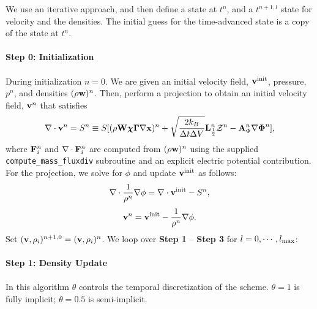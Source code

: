 \documentclass[final]{siamltex}
\def\Ab {{\bf A}}
\def\Fb {{\bf F}}
\def\Lb {{\bf L}}
\def\vb {{\bf v}}
\def\wb {{\bf w}}
\def\Wb {{\bf W}}
\def\xb {{\bf x}}
\def\chib   {\boldsymbol{\chi}}
\def\Gammab {\boldsymbol{\Gamma}}
\def\Phib   {\boldsymbol{\Phi}}
\def\half   {\frac{1}{2}}
\begin{document}
We use an iterative approach, and then define a state at $t^n$, and
a $t^{n+1,l}$ state for velocity and the densities.  The initial guess for
the time-advanced state is a copy of the state at $t^n$.\\ \\
{\bf Step 0: Initialization}\\ \\
During initialization $n=0$.
We are given an initial velocity field, $\vb^{\rm init}$, pressure, $p^n$,
and densities $(\rho\wb)^n$.
Then, perform a projection to obtain an initial velocity field, $\vb^n$ that satisfies
\begin{equation}
\nabla\cdot\vb^n = S^n \equiv 
S[(\rho\Wb\chib\Gammab\nabla\xb)^n + \sqrt{\frac{2k_B}{\Delta t\Delta V}}\Lb_\half^n\mathcal{Z}^n - \Ab_\Phi^n\nabla\Phib^n],
\end{equation}
where $\Fb_i^n$ and $\nabla\cdot\Fb_i^n$ are computed from $(\rho\wb)^n$ using the 
supplied {\tt compute\_mass\_fluxdiv} subroutine and an explicit electric
potential contribution.
For the projection, we solve for $\phi$ and update $\vb^{\rm init}$ as follows:
\begin{equation}
\nabla\cdot\frac{1}{\rho^n}\nabla\phi = \nabla\cdot\vb^{\rm init} - S^n,
\end{equation}
\begin{equation}
\vb^n = \vb^{\rm init} - \frac{1}{\rho^n}\nabla\phi.
\end{equation}
Set $(\vb,\rho_i)^{n+1,0} = (\vb,\rho_i)^n$.
We loop over {\bf Step 1} -- {\bf Step 3} for $l=0,\cdots,l_{\rm max}$:\\ \\
{\bf Step 1: Density Update}\\ \\
In this algorithm $\theta$ controls
the temporal discretization of the scheme.  $\theta=1$ is fully
implicit; $\theta=0.5$ is semi-implicit.\\ \\
\end{document}
